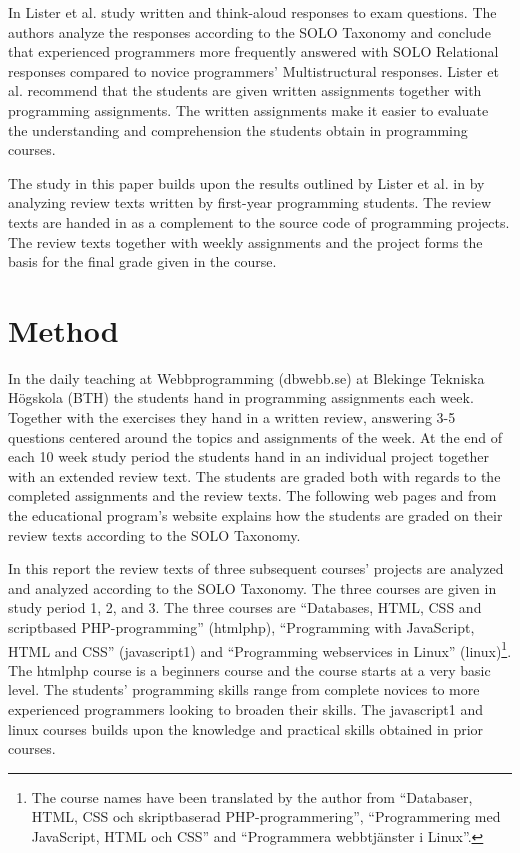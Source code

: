 \documentclass[twoside,twocolumn,a4paper,11pt,english]{article}
\begin{document}
In \cite{lister2006not} Lister et al. study written and think-aloud responses to exam questions. The authors analyze the responses according to the SOLO Taxonomy and conclude that experienced programmers more frequently answered with SOLO Relational responses compared to novice programmers' Multistructural responses. Lister et al. recommend that the students are given written assignments together with programming assignments. The written assignments make it easier to evaluate the understanding and comprehension the students obtain in programming courses.

The study in this paper builds upon the results outlined by Lister et al. in \cite{lister2006not} by analyzing review texts written by first-year programming students. The review texts are handed in as a complement to the source code of programming projects. The review texts together with weekly assignments and the project forms the basis for the final grade given in the course.




\section{Method}

In the daily teaching at Webbprogramming (dbwebb.se) at Blekinge Tekniska Högskola (BTH) the students hand in programming assignments each week. Together with the exercises they hand in a written review, answering 3-5 questions centered around the topics and assignments of the week. At the end of each 10 week study period the students hand in an individual project together with an extended review text. The students are graded both with regards to the completed assignments and the review texts. The following web pages \cite{redovisning} and \cite{solo} from the educational program's website explains how the students are graded on their review texts according to the SOLO Taxonomy.

In this report the review texts of three subsequent courses' projects are analyzed and analyzed according to the SOLO Taxonomy. The three courses are given in study period 1, 2, and 3. The three courses are ``Databases, HTML, CSS and scriptbased PHP-programming'' (htmlphp), ``Programming with JavaScript, HTML and CSS'' (javascript1) and ``Programming webservices in Linux'' (linux)\footnote{The course names have been translated by the author from ``Databaser, HTML, CSS och skriptbaserad PHP-programmering'', ``Programmering med JavaScript, HTML och CSS'' and ``Programmera webbtjänster i Linux''.}. The htmlphp course is a beginners course and the course starts at a very basic level. The students' programming skills range from complete novices to more experienced programmers looking to broaden their skills. The javascript1 and linux courses builds upon the knowledge and practical skills obtained in prior courses.
\end{document}

